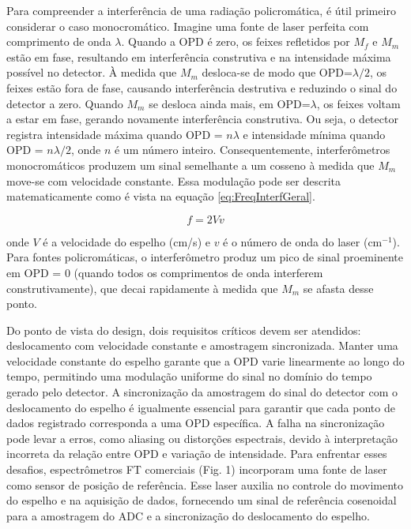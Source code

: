 \documentclass[oneside,openright,12pt]{ufsm_2021} %
\begin{document}
    \par Para compreender a interferência de uma radiação policromática, é útil primeiro considerar o caso monocromático. Imagine uma fonte de laser perfeita com comprimento de onda $\lambda$. Quando a OPD é zero, os feixes refletidos por $M_f$ e $M_m$ estão em fase, resultando em interferência construtiva e na intensidade máxima possível no detector. À medida que $M_m$ desloca-se de modo que OPD=$\lambda/2$, os feixes estão fora de fase, causando interferência destrutiva e reduzindo o sinal do detector a zero. Quando $M_m$ se desloca ainda mais, em OPD=$\lambda$, os feixes voltam a estar em fase, gerando novamente interferência construtiva. Ou seja, o detector registra intensidade máxima quando OPD = $n\lambda$ e intensidade mínima quando OPD = $n\lambda/2$, onde $n$ é um número inteiro. Consequentemente, interferômetros monocromáticos produzem um sinal semelhante a um cosseno à medida que $M_m$ move-se com velocidade constante. Essa modulação pode ser descrita matematicamente como é vista na equação \ref{eq:FreqInterfGeral}.
    
    \begin{equation}
        \label{eq:FreqInterfGeral}
        f = 2Vv
    \end{equation}
    
    onde $V$ é a velocidade do espelho (cm/s) e $v$ é o número de onda do laser (cm$^{-1}$). Para fontes policromáticas, o interferômetro produz um pico de sinal proeminente em OPD = 0 (quando todos os comprimentos de onda interferem construtivamente), que decai rapidamente à medida que $M_m$ se afasta desse ponto.

    \par Do ponto de vista do design, dois requisitos críticos devem ser atendidos: deslocamento com velocidade constante e amostragem sincronizada. Manter uma velocidade constante do espelho garante que a OPD varie linearmente ao longo do tempo, permitindo uma modulação uniforme do sinal no domínio do tempo gerado pelo detector. A sincronização da amostragem do sinal do detector com o deslocamento do espelho é igualmente essencial para garantir que cada ponto de dados registrado corresponda a uma OPD específica. A falha na sincronização pode levar a erros, como aliasing ou distorções espectrais, devido à interpretação incorreta da relação entre OPD e variação de intensidade. Para enfrentar esses desafios, espectrômetros FT comerciais (Fig. 1) incorporam uma fonte de laser como sensor de posição de referência. Esse laser auxilia no controle do movimento do espelho e na aquisição de dados, fornecendo um sinal de referência cosenoidal para a amostragem do ADC e a sincronização do deslocamento do espelho.
\end{document}
